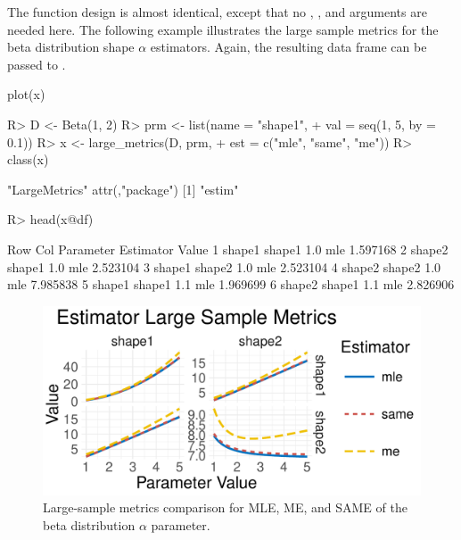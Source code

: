 \documentclass[nojss]{jss}
\newcommand{\fct}[1]{\code{#1()}}
\begin{document}
The \fct{large\_metrics} function design is almost identical, except that no , , and  arguments are needed here. The following example illustrates the large sample metrics for the beta distribution shape $\alpha$ estimators. Again, the resulting data frame can be passed to \fct{plot}.

\begin{CodeChunk}
\begin{CodeInput}
plot(x)
\end{CodeInput}
\end{CodeChunk}

\begin{Schunk}
\begin{Sinput}
R> D <- Beta(1, 2)
R> prm <- list(name = "shape1",
+              val = seq(1, 5, by = 0.1))
R> x <- large_metrics(D, prm,
+                     est = c("mle", "same", "me"))
R> class(x)
\end{Sinput}
\begin{Soutput}
[1] "LargeMetrics"
attr(,"package")
[1] "estim"
\end{Soutput}
\begin{Sinput}
R> head(x@df)
\end{Sinput}
\begin{Soutput}
     Row    Col Parameter Estimator    Value
1 shape1 shape1       1.0       mle 1.597168
2 shape2 shape1       1.0       mle 2.523104
3 shape1 shape2       1.0       mle 2.523104
4 shape2 shape2       1.0       mle 7.985838
5 shape1 shape1       1.1       mle 1.969699
6 shape2 shape1       1.1       mle 2.826906
\end{Soutput}
\end{Schunk}

\begin{figure}[t!]
\centering
\includegraphics{estim_jss-vis_large_beta}
  \caption{\label{fig:vis-large-beta} Large-sample metrics comparison for MLE, ME, and SAME of the beta distribution $\alpha$ parameter.}
\end{figure}
\end{document}
